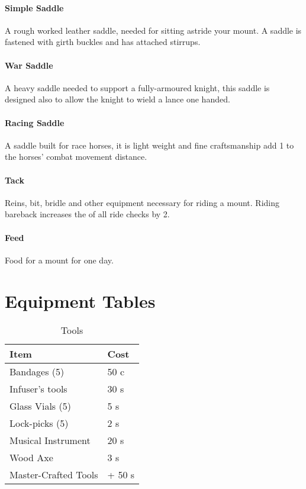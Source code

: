 \documentclass[a4paper,11pt,oneside]{book}
\newcommand{\textlf}[1]{\textbf{\titlecap{#1}}}
\begin{document}
\subsubsection*{Simple Saddle}
A rough worked leather saddle, needed for sitting astride your mount. A saddle is fastened with girth buckles and has attached stirrups.

\subsubsection*{War Saddle}
A heavy saddle needed to support a fully-armoured knight, this saddle is designed also to allow the knight to wield a lance one handed.

\subsubsection*{Racing Saddle}
A saddle built for race horses, it is light weight and fine craftsmanship add 1 to the horses' combat movement distance.

\subsubsection*{Tack}
Reins, bit, bridle and other equipment necessary for riding a mount. Riding bareback increases the \textlf{difficulty} of all ride checks by 2.

\subsubsection*{Feed}
Food for a mount for one day.

\chapter{Equipment Tables}
\begin{table}[ht]
	\centering
	\caption{Tools}
	\begin{tabular}{|l|l|}
		\hline
		Item & Cost\\ [0.5ex]
		\hline
		Bandages (5)& 50 c\\
		Infuser's tools & 30 s\\
		Glass Vials (5)& 5 s\\
		Lock-picks (5) & 2 s\\
		Musical Instrument & 20 s\\
		Wood Axe & 3 s\\		
		\hline
		Master-Crafted Tools & + 50 s\\
		\hline
	\end{tabular}
\end{table}
\end{document}
